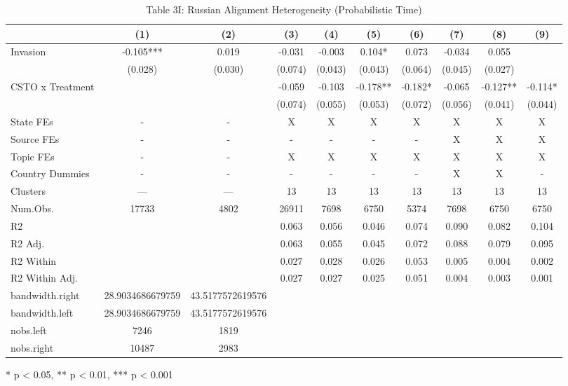 \begin{table}[!t]
\caption{Table 3I: Russian Alignment Heterogeneity (Probabilistic Time)} 
\fontsize{12.0pt}{14.4pt}\selectfont
\begin{tabular*}{\linewidth}{@{\extracolsep{\fill}}lccccccccc}
\toprule
  & (1) & (2) & (3) & (4) & (5) & (6) & (7) & (8) & (9) \\ 
\midrule\addlinespace[2.5pt]
Invasion & -0.105*** & 0.019 & -0.031 & -0.003 & 0.104* & 0.073 & -0.034 & 0.055 &  \\ 
 & (0.028) & (0.030) & (0.074) & (0.043) & (0.043) & (0.064) & (0.045) & (0.027) &  \\ 
CSTO x Treatment &  &  & -0.059 & -0.103 & -0.178** & -0.182* & -0.065 & -0.127** & -0.114* \\ 
{} & {} & {} & {(0.074)} & {(0.055)} & {(0.053)} & {(0.072)} & {(0.056)} & {(0.041)} & {(0.044)} \\ 
State FEs & - & - & X & X & X & X & X & X & X \\ 
Source FEs & - & - & - & - & - & - & X & X & X \\ 
Topic FEs & - & - & X & X & X & X & X & X & X \\ 
Country Dummies & - & - & - & - & - & - & X & X & - \\ 
Clusters & — & — & 13 & 13 & 13 & 13 & 13 & 13 & 13 \\ 
Num.Obs. & 17733 & 4802 & 26911 & 7698 & 6750 & 5374 & 7698 & 6750 & 6750 \\ 
R2 &  &  & 0.063 & 0.056 & 0.046 & 0.074 & 0.090 & 0.082 & 0.104 \\ 
R2 Adj. &  &  & 0.063 & 0.055 & 0.045 & 0.072 & 0.088 & 0.079 & 0.095 \\ 
R2 Within &  &  & 0.027 & 0.028 & 0.026 & 0.053 & 0.005 & 0.004 & 0.002 \\ 
R2 Within Adj. &  &  & 0.027 & 0.027 & 0.025 & 0.051 & 0.004 & 0.003 & 0.001 \\ 
bandwidth.right & 28.9034686679759 & 43.5177572619576 &  &  &  &  &  &  &  \\ 
bandwidth.left & 28.9034686679759 & 43.5177572619576 &  &  &  &  &  &  &  \\ 
nobs.left & 7246 & 1819 &  &  &  &  &  &  &  \\ 
nobs.right & 10487 & 2983 &  &  &  &  &  &  &  \\ 
\bottomrule
\end{tabular*}
\begin{minipage}{\linewidth}
* p < 0.05, ** p < 0.01, *** p < 0.001\\

\end{minipage}
\end{table}
